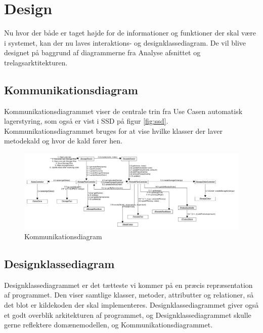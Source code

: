 \chapter{Design}\label{ch:design}
Nu hvor der både er taget højde for de informationer og funktioner der skal være i systemet, kan der nu laves interaktions- og designklassediagram. De vil blive designet på baggrund af diagrammerne fra Analyse afsnittet og trelagsarktitekturen. 

\section{Kommunikationsdiagram}
Kommunikationsdiagrammet viser de centrale trin fra Use Casen automatisk lagerstyring, som også er vist i SSD på figur \ref{fig:ssd}. Kommunikationsdiagrammet bruges for at vise hvilke klasser der laver metodekald og hvor de kald fører hen.

\begin{landscape}
    \begin{figure}[p]
        \centering
        \includegraphics[width=\hsize]{figures/design/Kommunikationsdiagram}
        \caption{Kommunikationsdiagram}
        \label{fig:Kommunikationsdiagram}
    \end{figure}
\end{landscape}

\section{Designklassediagram}
Designklassediagrammet er det tætteste vi kommer på en præcis repræsentation af programmet. Den viser samtlige klasser, metoder, attributter og relationer, så det blot er kildekoden der skal implementeres. Designklassediagrammet giver også et godt overblik arkitekturen af programmet, og Designklassediagrammet skulle gerne reflektere domænemodellen, og Kommunikationsdiagrammet.

